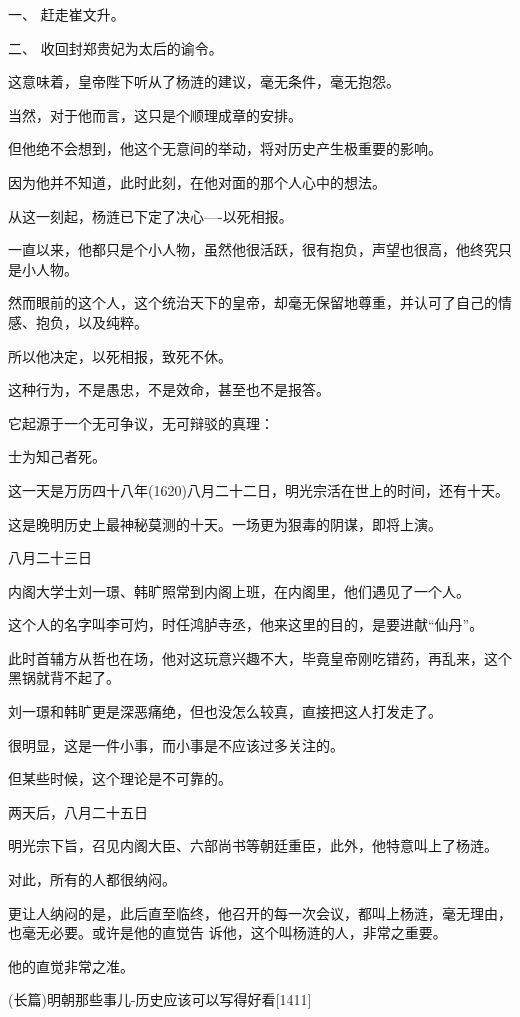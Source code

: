 \documentclass[11pt,a4paper,onecolumn]{article}
\begin{document}
一、 赶走崔文升。

二、 收回封郑贵妃为太后的谕令。

这意味着，皇帝陛下听从了杨涟的建议，毫无条件，毫无抱怨。

当然，对于他而言，这只是个顺理成章的安排。

但他绝不会想到，他这个无意间的举动，将对历史产生极重要的影响。

因为他并不知道，此时此刻，在他对面的那个人心中的想法。

从这一刻起，杨涟已下定了决心----以死相报。

一直以来，他都只是个小人物，虽然他很活跃，很有抱负，声望也很高，他终究只是小人物。

然而眼前的这个人，这个统治天下的皇帝，却毫无保留地尊重，并认可了自己的情感、抱负，以及纯粹。

所以他决定，以死相报，致死不休。

这种行为，不是愚忠，不是效命，甚至也不是报答。

它起源于一个无可争议，无可辩驳的真理：

士为知己者死。

这一天是万历四十八年(1620)八月二十二日，明光宗活在世上的时间，还有十天。

这是晚明历史上最神秘莫测的十天。一场更为狠毒的阴谋，即将上演。

八月二十三日

内阁大学士刘一璟、韩旷照常到内阁上班，在内阁里，他们遇见了一个人。

这个人的名字叫李可灼，时任鸿胪寺丞，他来这里的目的，是要进献``仙丹''。

此时首辅方从哲也在场，他对这玩意兴趣不大，毕竟皇帝刚吃错药，再乱来，这个黑锅就背不起了。

刘一璟和韩旷更是深恶痛绝，但也没怎么较真，直接把这人打发走了。

很明显，这是一件小事，而小事是不应该过多关注的。

但某些时候，这个理论是不可靠的。

两天后，八月二十五日

明光宗下旨，召见内阁大臣、六部尚书等朝廷重臣，此外，他特意叫上了杨涟。

对此，所有的人都很纳闷。

更让人纳闷的是，此后直至临终，他召开的每一次会议，都叫上杨涟，毫无理由，也毫无必要。或许是他的直觉告
诉他，这个叫杨涟的人，非常之重要。

他的直觉非常之准。

(长篇)明朝那些事儿-历史应该可以写得好看$[$1411$]$
\end{document}
